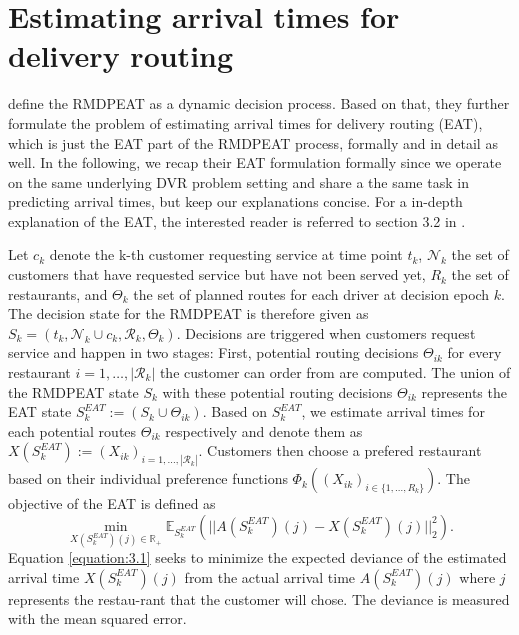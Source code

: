 \section{Estimating arrival times for delivery routing}

\cite{Hildebrandt2020_EAT} define the RMDPEAT as a dynamic decision process. Based on that, they further formulate the problem of estimating arrival times for delivery routing (EAT), which is just the EAT part of the RMDPEAT process, formally and in detail as well. In the following, we recap their EAT formulation formally since we operate on the same underlying DVR problem setting and share a the same task in predicting arrival times, but keep our explanations concise. For a in-depth explanation of the EAT, the interested reader is referred to section 3.2 in \cite{Hildebrandt2020_EAT}. 

Let $ c_k $ denote the k-th customer requesting service at time point $ t_k $, $ \mathcal{N}_k $ the set of customers that have requested service but have not been served yet, $ R_k $ the set of restaurants, and $ \Theta_k $ the set of planned routes for each driver at decision epoch $ k $. The decision state for the RMDPEAT is therefore given as $ S_k = (t_k, \mathcal{N}_k \cup c_k, \mathcal{R}_k, \Theta_k) $. Decisions are triggered when customers request service and happen in two stages: First, potential routing decisions $ \Theta_{ik} $ for every restaurant $ i = 1, \dots, |\mathcal{R}_k| $ the customer can order from are computed. The union of the RMDPEAT state $ S_k $ with these potential routing decisions $ \Theta_{ik} $ represents the EAT state $ S^{EAT}_k := (S_k \cup \Theta_{ik})$. Based on $ S^{EAT}_k $, we estimate arrival times for each potential routes $ \Theta_{ik} $ respectively and denote them as $ X(S^{EAT}_k) := (X_{ik})_{i = 1, \dots, |\mathcal{R}_k|}$. Customers then choose a prefered restaurant based on their individual preference functions $ \Phi_k((X_{ik})_{i \in \{1,\dots, R_k\}}) $.  
The objective of the EAT is defined as
\begin{equation}\label{equation:3.1}
	\min_{X(S^{EAT}_k)(j) \in \mathbb{R}_+} 
	\mathbb{E}_{S^{EAT}_{k}} 
	(|| A(S^{EAT}_{k})(j) - X(S^{EAT}_{k})(j)||^{2}_{2}).
\end{equation}
Equation \ref{equation:3.1} seeks to minimize the expected deviance of the estimated arrival time $ X(S^{EAT}_{k})(j) $ from the actual arrival time $ A(S^{EAT}_{k})(j) $ where $ j $ represents the restau-rant that the customer will chose. The deviance is measured with the mean squared error. 

